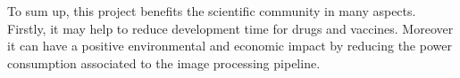 \documentclass[../main.tex]{subfiles}
\begin{document}
To sum up, this project benefits the scientific community in many aspects. Firstly, it may help to reduce development time for drugs and vaccines. Moreover it can have a positive environmental and economic impact by reducing the power consumption associated to the image processing pipeline. 
\end{document}
